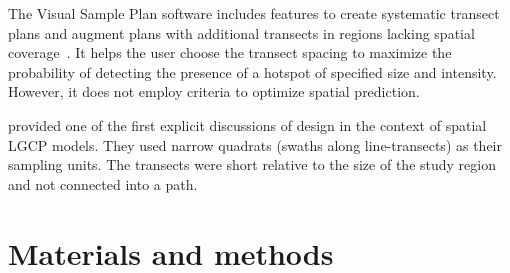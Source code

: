 \documentclass[review]{elsarticle}
\begin{document}
The Visual Sample Plan software includes features to create systematic transect
plans and augment plans with additional transects in regions lacking spatial
coverage~\citep{vspguide}. It helps the user choose the transect spacing to
maximize the probability of detecting the presence of a hotspot of specified
size and intensity. However, it does not employ criteria to optimize spatial
prediction.

\citet{liuvanhatalo} provided one of the first explicit discussions of design
in the context of spatial LGCP models. They used narrow quadrats (swaths along
line-transects) as their sampling units. The transects were short relative to
the size of the study region and not connected into a path.







\section{Materials and methods}

\end{document}
